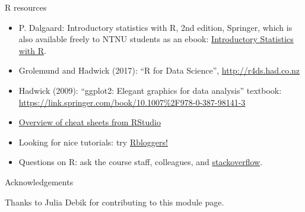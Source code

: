 \documentclass[10pt,ignorenonframetext,]{beamer}
\begin{document}
\begin{frame}

\begin{block}{R resources}

\begin{itemize}
\item
  P. Dalgaard: Introductory statistics with R, 2nd edition, Springer,
  which is also available freely to NTNU students as an ebook:
  \href{http://link.springer.com/book/10.1007\%2F978-0-387-79054-1}{Introductory
  Statistics with R}.
\item
  Grolemund and Hadwick (2017): ``R for Data Science'',
  \url{http://r4ds.had.co.nz}
\item
  Hadwick (2009): ``ggplot2: Elegant graphics for data analysis''
  textbook:
  \url{https://link.springer.com/book/10.1007\%2F978-0-387-98141-3}
\item
  \href{https://www.rstudio.com/resources/cheatsheets/}{Overview of
  cheat sheets from RStudio}
\item
  Looking for nice tutorials: try
  \href{https://www.r-bloggers.com/}{Rbloggers!}
\item
  Questions on R: ask the course staff, colleagues, and
  \href{https://stackoverflow.com/}{stackoverflow}.
\end{itemize}

\end{block}

\end{frame}

\begin{frame}{Acknowledgements}

Thanks to Julia Debik for contributing to this module page.

\end{frame}
\end{document}
